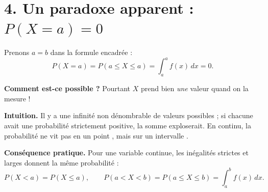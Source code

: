 
\section*{4. Un paradoxe apparent : $P(X=a)=0$}

Prenons $a=b$ dans la formule encadrée :
\[
  P(X=a)=P(a\le X\le a)=\int_a^a f(x)\,dx = 0.
\]

\textbf{Comment est-ce possible ?}
Pourtant $X$ prend bien \emph{une} valeur quand on la mesure !

\medskip

\textbf{Intuition.} Il y a une infinité non dénombrable de valeurs
possibles ; si chacune avait une probabilité strictement positive,
la somme exploserait. En continu, la probabilité ne vit pas
\og en un point \fg{}, mais \og sur un intervalle \fg{}.

\medskip

\textbf{Conséquence pratique.}
Pour une variable continue, les inégalités strictes et larges
donnent la même probabilité :
\[
  P(X<a)=P(X\le a),\qquad P(a<X<b)=P(a\le X\le b)
  =\int_a^b f(x)\,dx.
\]

